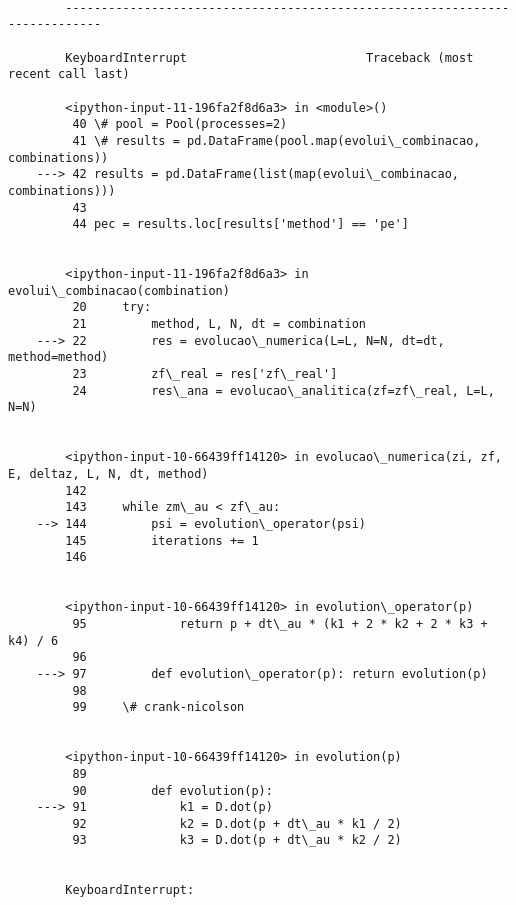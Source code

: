 \documentclass[11pt]{article}
\begin{document}
    \begin{Verbatim}[commandchars=\\\{\}]

        ---------------------------------------------------------------------------

        KeyboardInterrupt                         Traceback (most recent call last)

        <ipython-input-11-196fa2f8d6a3> in <module>()
         40 \# pool = Pool(processes=2)
         41 \# results = pd.DataFrame(pool.map(evolui\_combinacao, combinations))
    ---> 42 results = pd.DataFrame(list(map(evolui\_combinacao, combinations)))
         43 
         44 pec = results.loc[results['method'] == 'pe']


        <ipython-input-11-196fa2f8d6a3> in evolui\_combinacao(combination)
         20     try:
         21         method, L, N, dt = combination
    ---> 22         res = evolucao\_numerica(L=L, N=N, dt=dt, method=method)
         23         zf\_real = res['zf\_real']
         24         res\_ana = evolucao\_analitica(zf=zf\_real, L=L, N=N)


        <ipython-input-10-66439ff14120> in evolucao\_numerica(zi, zf, E, deltaz, L, N, dt, method)
        142 
        143     while zm\_au < zf\_au:
    --> 144         psi = evolution\_operator(psi)
        145         iterations += 1
        146 


        <ipython-input-10-66439ff14120> in evolution\_operator(p)
         95             return p + dt\_au * (k1 + 2 * k2 + 2 * k3 + k4) / 6
         96 
    ---> 97         def evolution\_operator(p): return evolution(p)
         98 
         99     \# crank-nicolson


        <ipython-input-10-66439ff14120> in evolution(p)
         89 
         90         def evolution(p):
    ---> 91             k1 = D.dot(p)
         92             k2 = D.dot(p + dt\_au * k1 / 2)
         93             k3 = D.dot(p + dt\_au * k2 / 2)


        KeyboardInterrupt: 

    \end{Verbatim}
\end{document}
